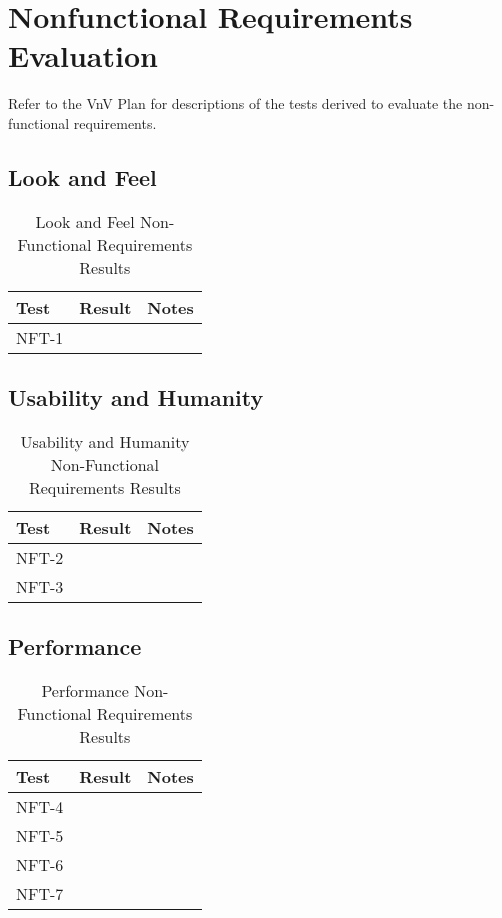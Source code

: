 \documentclass[12pt, titlepage]{article}
\begin{document}
\section{Nonfunctional Requirements Evaluation}
Refer to the VnV Plan for descriptions of the tests derived to evaluate the non-functional requirements.

\subsection{Look and Feel}

\begin{table}[H]
\centering
    \setlength{\leftmargini}{0.4cm}
    \begin{tabular}{| >{\centering\arraybackslash}m{3cm} | 
      >{\centering\arraybackslash}m{4cm} | 
      >{\centering\arraybackslash}m{6cm} |}
    \hline
    \rowcolor[gray]{0.9}
    Test & Result & Notes\\
    \hline
    NFT-1 &  & \\
    \hline
    \end{tabular}
\caption{Look and Feel Non-Functional Requirements Results}
\end{table}
		
\subsection{Usability and Humanity}

\begin{table}[H]
\centering
    \setlength{\leftmargini}{0.4cm}
    \begin{tabular}{| >{\centering\arraybackslash}m{3cm} | 
      >{\centering\arraybackslash}m{4cm} | 
      >{\centering\arraybackslash}m{6cm} |}
    \hline
    \rowcolor[gray]{0.9}
    Test & Result & Notes\\
    \hline
    NFT-2 &  & \\
    \hline
    NFT-3 &  & \\
    \hline
    \end{tabular}
\caption{Usability and Humanity Non-Functional Requirements Results}
\end{table}

\subsection{Performance}

\begin{table}[H]
\centering
    \setlength{\leftmargini}{0.4cm}
    \begin{tabular}{| >{\centering\arraybackslash}m{3cm} | 
      >{\centering\arraybackslash}m{4cm} | 
      >{\centering\arraybackslash}m{6cm} |}
    \hline
    \rowcolor[gray]{0.9}
    Test & Result & Notes\\
    \hline
    NFT-4 &  & \\
    \hline
    NFT-5 &  & \\
    \hline
    NFT-6 &  & \\
    \hline
    NFT-7 &  & \\
    \hline
    \end{tabular}
\caption{Performance Non-Functional Requirements Results}
\end{table}
\end{document}
